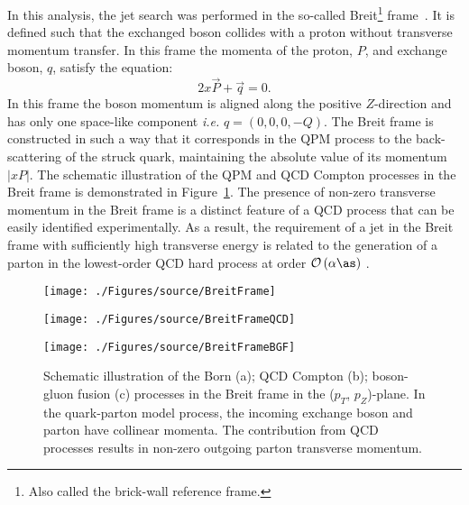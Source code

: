 In this analysis, the jet search was performed in the so-called Breit\footnote{Also called the brick-wall reference frame.} frame~\cite{feynman:1972:photon,zfp:c2:237}. It is defined such that the exchanged boson collides with a proton without transverse momentum transfer. In this frame the momenta of the proton, $P$, and exchange boson, $q$, satisfy the equation:
\begin{equation}
2x\vec{P} + \vec{q} = 0.
\label{eq:breitframe}
\end{equation}
In this frame the boson momentum is aligned along the positive $Z$-direction and has only one space-like component \textit{i.e.} $q=\left( 0, 0, 0, -Q\right)$. The Breit frame is constructed in such a way that it corresponds in the QPM process to the back-scattering of the struck quark, maintaining the absolute value of its momentum $\left|xP\right|$. The schematic illustration of the QPM and QCD Compton processes in the Breit frame is demonstrated in Figure~\ref{fig:breitframe}. The presence of non-zero transverse momentum in the Breit frame is a distinct feature of a QCD process that can be easily identified experimentally. As a result, the requirement of a jet in the Breit frame with sufficiently high transverse energy is related to the generation of a parton in the lowest-order QCD hard process at order $\mathcal{O}\left(\alpha\as\right)$ .
\begin{figure}
	\centering
	\begin{subfloat}[]{
		\texttt{[image: ./Figures/source/BreitFrame]}
		\label{fig:breitframeqpm}
	}%
	\end{subfloat}
	\begin{subfloat}[]{
		\texttt{[image: ./Figures/source/BreitFrameQCD]}
		\label{fig:breitframeqcd}
	}%
	\end{subfloat}
	\begin{subfloat}[]{
		\texttt{[image: ./Figures/source/BreitFrameBGF]}
		\label{fig:breitframeqcd}
	}%
	\end{subfloat}
	\caption{Schematic illustration of the Born (a); QCD Compton (b); boson-gluon fusion (c) processes in the Breit frame in the ($p_T$, $p_Z$)-plane. In the quark-parton model process, the incoming exchange boson and parton have collinear momenta. The contribution from QCD processes results in non-zero outgoing parton transverse momentum.}
\label{fig:breitframe}
\end{figure}